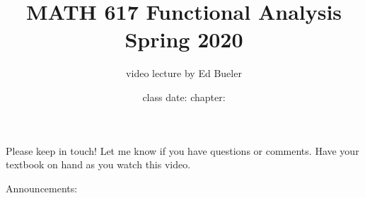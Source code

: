 \documentclass[hyperref]{beamer}
\title{MATH 617 Functional Analysis Spring 2020}
\subtitle{video lecture by Ed Bueler}
\author[]{class date: \framebox{\phantom{dlfs{\LARGE \strut} asdf asd}} \qquad chapter: \framebox{\phantom{dlfs{\LARGE \strut} asdf asd sj asdfjklj aj}}}
\date{}
\begin{document}
\beamertemplatenavigationsymbolsempty

\begin{frame}
\thispagestyle{empty}
\titlepage

Please keep in touch! Let me know if you have questions or comments.  Have your textbook on hand as you watch this video.

\bigskip
Announcements:

\vspace{1.5in}
\end{frame}
\end{document}
